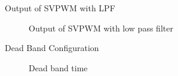 \begin{frame}{Output of SVPWM with LPF}
	\begin{figure}
		\centering


		\caption{Output of SVPWM with low pass filter}
	\end{figure}
\end{frame}



\begin{frame}{Dead Band Configuration}
	\begin{figure}
		\centering


		\caption{Dead band time}
	\end{figure}
\end{frame}

